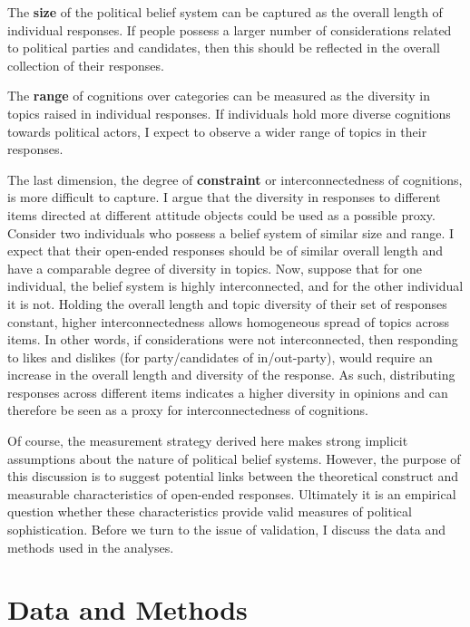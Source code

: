 \documentclass[12pt]{article}
\begin{document}
The \textbf{size} of the political belief system can be captured as the overall length of individual responses. If people possess a larger number of considerations related to political parties and candidates, then this should be reflected in the  overall collection of their responses.

The \textbf{range} of cognitions over categories can be measured as the diversity in topics raised in individual responses. If individuals hold more diverse cognitions towards political actors, I expect to observe a wider range of topics in their responses.

The last dimension, the degree of \textbf{constraint} or interconnectedness of cognitions, is more difficult to capture. I argue that the diversity in responses to different items directed at different attitude objects could be used as a possible proxy. Consider two individuals who possess a belief system of similar size and range. I expect that their open-ended responses should be of similar overall length and have a comparable degree of diversity in topics. Now, suppose that for one individual, the belief system is highly interconnected, and for the other individual it is not. Holding the overall length and topic diversity of their set of responses constant, higher interconnectedness allows homogeneous spread of topics across items. In other words, if considerations were not interconnected, then responding to likes and dislikes (for party/candidates of in/out-party), would require an increase in the overall length and diversity of the response. As such, distributing responses across different items indicates a higher diversity in opinions and can therefore be seen as a proxy for interconnectedness of cognitions.

Of course, the measurement strategy derived here makes strong implicit assumptions about the nature of political belief systems. However, the purpose of this discussion is to suggest potential links between the theoretical construct and measurable characteristics of open-ended responses. Ultimately it is an empirical question whether these characteristics provide valid measures of political sophistication. Before we turn to the issue of validation, I discuss the data and methods used in the analyses.


\section*{Data and Methods}
\end{document}

